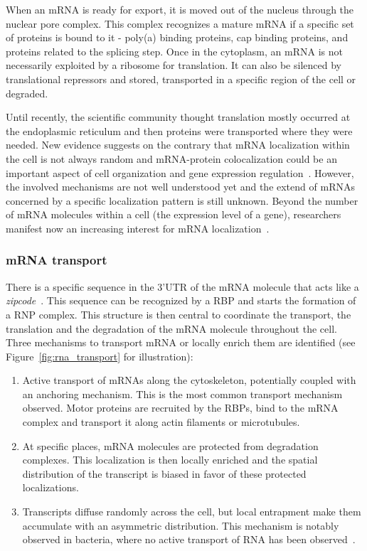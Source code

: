 When an \ac{mRNA} is ready for export, it is moved out of the nucleus through the nuclear pore complex.
This complex recognizes a mature \ac{mRNA} if a specific set of proteins is bound to it - poly(a) binding proteins, cap binding proteins, and proteins related to the splicing step.
Once in the cytoplasm, an \ac{mRNA} is not necessarily exploited by a ribosome for translation.
It can also be silenced by translational repressors and stored, transported in a specific region of the cell or degraded.

Until recently, the scientific community thought translation mostly occurred at the endoplasmic reticulum and then proteins were transported where they were needed.
New evidence suggests on the contrary that \ac{mRNA} localization within the cell is not always random and \ac{mRNA}-protein colocalization could be an important aspect of cell organization and gene expression regulation~\cite{lecuyer_global_2007}.
However, the involved mechanisms are not well understood yet and the extend of \ac{mRNA}s concerned by a specific localization pattern is still unknown.
Beyond the number of \ac{mRNA} molecules within a cell (the expression level of a gene), researchers manifest now an increasing interest for \ac{mRNA} localization~\cite{Chin_lecuyer_2017}.

\subsubsection{mRNA transport}

There is a specific sequence in the 3'UTR of the \ac{mRNA} molecule that acts like a \emph{zipcode}~\cite{Chabanon_2004}.
This sequence can be recognized by a \ac{RBP} and starts the formation of a \ac{RNP} complex.
This structure is then central to coordinate the transport, the translation and the degradation of the \ac{mRNA} molecule throughout the cell.\\

\noindent
Three mechanisms to transport \ac{mRNA} or locally enrich them are identified (see Figure~\ref{fig:rna_transport} for illustration):
\begin{enumerate}
	\setlength\itemsep{0.1em}
	\item Active transport of \ac{mRNA}s along the cytoskeleton, potentially coupled with an anchoring mechanism.
	This is the most common transport mechanism observed.
	Motor proteins are recruited by the \ac{RBP}s, bind to the \ac{mRNA} complex and transport it along actin filaments or microtubules.
	\item At specific places, \ac{mRNA} molecules are protected from degradation complexes.
	This localization is then locally enriched and the spatial distribution of the transcript is biased in favor of these protected localizations.
	\item Transcripts diffuse randomly across the cell, but local entrapment make them accumulate with an asymmetric distribution.
	This mechanism is notably observed in bacteria, where no active transport of \ac{RNA} has been observed~\cite{das_intracellular_2021}.
\end{enumerate}

